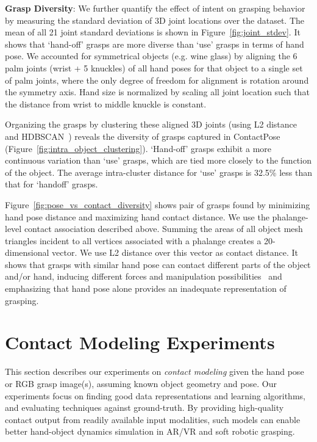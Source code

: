 \documentclass[runningheads]{llncs}
\begin{document}
\noindent\textbf{Grasp Diversity}: We further quantify the effect of intent on grasping behavior by measuring the standard deviation of 3D joint locations over the dataset. The mean of all 21 joint standard deviations is shown in Figure~\ref{fig:joint_stdev}. It shows that `hand-off' grasps are more diverse than `use' grasps in terms of hand pose. We accounted for symmetrical objects (e.g. wine glass) by aligning the 6 palm joints (wrist + 5 knuckles) of all hand poses for that object to a single set of palm joints, where the only degree of freedom for alignment is rotation around the symmetry axis. Hand size is normalized by scaling all joint location such that the distance from wrist to middle knuckle is constant.

Organizing the grasps by clustering these aligned 3D joints (using L2 distance and HDBSCAN~\cite{hdbscan}) reveals the diversity of grasps captured in ContactPose (Figure~\ref{fig:intra_object_clustering}). `Hand-off' grasps exhibit a more continuous variation than `use' grasps, which are tied more closely to the function of the object. The average intra-cluster distance for `use' grasps is 32.5\% less than that for `handoff' grasps.

Figure~\ref{fig:pose_vs_contact_diversity} shows pair of grasps found by minimizing hand pose distance and maximizing hand contact distance. We use the phalange-level contact association described above. Summing the areas of all object mesh triangles incident to all vertices associated with a phalange creates a 20-dimensional vector. We use L2 distance over this vector as contact distance. It shows that grasps with similar hand pose can contact different parts of the object and/or hand, inducing different forces and manipulation possibilities~\cite{FHAD_FirstPersonAction} and emphasizing that hand pose alone provides an inadequate representation of grasping.

%
 \section{Contact Modeling Experiments} \label{sec:learning}
This section describes our experiments on \textit{contact modeling} given the hand pose or RGB grasp image(s), assuming known object geometry and pose. Our experiments focus on finding good data representations and learning algorithms, and evaluating techniques against ground-truth. By providing high-quality contact output from readily available input modalities, such models can enable better hand-object dynamics simulation in AR/VR and soft robotic grasping.
\end{document}
